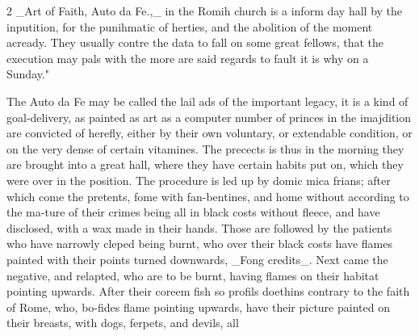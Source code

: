 \documentclass[10pt]{article}
\begin{document}
\begin{multicols}{2}
\_Art of Faith, Auto da Fe.,\_ in the Romih church is a inform day hall by the inputition, for the punihmatic of herties, and the abolition of the moment acready. They usually contre the data to fall on some great fellows, that the execution may pals with the more are said regards to fault it is why on a Sunday."

The Auto da Fe may be called the lail ads of the important legacy, it is a kind of goal-delivery, as painted as art as a computer number of princes in the imajdition are convicted of herefly, either by their own voluntary, or extendable condition, or on the very dense of certain vitamines. The precects is thus in the morning they are brought into a great hall, where they have certain habits put on, which they were over in the position. The procedure is led up by domic mica frians; after which come the pretents, fome with fan-bentines, and home without according to the ma-ture of their crimes being all in black costs without fleece, and have disclosed, with a wax made in their hands. Those are followed by the patients who have narrowly cleped being burnt, who over their black costs have flames painted with their points turned downwards, \_Fong credits\_. Next came the negative, and relapted, who are to be burnt, having flames on their habitat pointing upwards. After their coreem fish so profils doethins contrary to the faith of Rome, who, bo-fides flame pointing upwards, have their picture painted on their breasts, with dogs, ferpets, and devils, all


\end{multicols}
\end{document}
